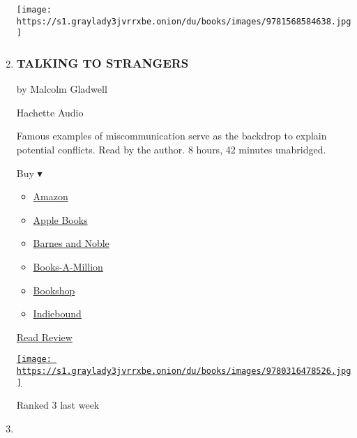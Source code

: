 \begin{enumerate}
  \texttt{[image: https://s1.graylady3jvrrxbe.onion/du/books/images/9781568584638.jpg]}
\item
  \href{https://www.nytimes3xbfgragh.onion/2019/09/04/books/review-talking-to-strangers-malcolm-gladwell.html}{}

  \hypertarget{talking-to-strangers}{%
  \subsubsection{TALKING TO STRANGERS}\label{talking-to-strangers}}

  by Malcolm Gladwell

  Hachette Audio

  Famous examples of miscommunication serve as the backdrop to explain
  potential conflicts. Read by the author. 8 hours, 42 minutes
  unabridged.

  Buy ▾

  \begin{itemize}
  \tightlist
  \item
    \href{https://www.amazon.com/Talking-Strangers-Should-about-People/dp/0316478520?tag=NYTBS-20}{Amazon}
  \item
    \href{https://du-gae-books-dot-nyt-du-prd.appspot.com/buy?title=TALKING+TO+STRANGERS\&author=Malcolm+Gladwell}{Apple
    Books}
  \item
    \href{https://www.anrdoezrs.net/click-7990613-11819508?url=https\%3A\%2F\%2Fwww.barnesandnoble.com\%2Fw\%2F\%3Fean\%3D9781549150340}{Barnes
    and Noble}
  \item
    \href{https://www.anrdoezrs.net/click-7990613-35140?url=https\%3A\%2F\%2Fwww.booksamillion.com\%2Fp\%2FTALKING\%2BTO\%2BSTRANGERS\%2FMalcolm\%2BGladwell\%2F9781549150340}{Books-A-Million}
  \item
    \href{https://bookshop.org/a/3546/9781549150340}{Bookshop}
  \item
    \href{https://www.indiebound.org/book/9781549150340?aff=NYT}{Indiebound}
  \end{itemize}

  \href{https://www.nytimes3xbfgragh.onion/2019/09/04/books/review-talking-to-strangers-malcolm-gladwell.html}{Read
  Review}

  \href{https://www.nytimes3xbfgragh.onion/2019/09/04/books/review-talking-to-strangers-malcolm-gladwell.html}{\texttt{[image: https://s1.graylady3jvrrxbe.onion/du/books/images/9780316478526.jpg]}}

  Ranked 3 last week
\item
  \hypertarget{just-mercy}{%
}
\end{enumerate}
